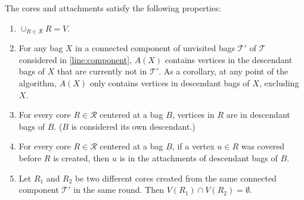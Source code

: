 \documentclass{article}
\newcommand{\mt}{\mathcal{T}}
\def\coreSet{\mathcal{R}}
\def\core{R}
\begin{document}
\begin{claim}\label{clm:core-region-prop}  The cores and attachments satisfy the following properties:
	\begin{enumerate}
		\item\label{it:core-covering} $\cup_{\core \in \coreSet}\core =  V$. 
		\item\label{it:attac-des} For any bag $X$ in a connected component of unvisited bags $\mathcal{T}'$ of $\mathcal{T}$ considered in  \cref{line:component}, $A(X)$ contains vertices in the descendant bags of $X$ that are currently not in $\mathcal{T}'$. As a corollary, at any point of the algorithm, $A(X)$ only contains vertices in descendant bags of $X$, excluding~$X$.
		\item  \label{it:topdown-carving} For every core $\core\in \coreSet$ centered at a bag $B$, vertices in $R$ are in descendant bags of $B$. ($B$ is considered its own descendant.) 
		\item \label{it:covered-attac}  For every core $\core \in \coreSet$ centered at a bag $B$, if a vertex $u\in \core$ was covered before $\core$ is created, then $u$ is in the attachments of descendant bags of $B$. 
		\item \label{it:core-dijst}  Let $\core_1$ and $\core_2$ be two different cores created from the same connected component $\mt'$ in the same round. Then $V(\core_1)\cap V(\core_2) = \emptyset$. 
	\end{enumerate}    
\end{claim}
\end{document}
